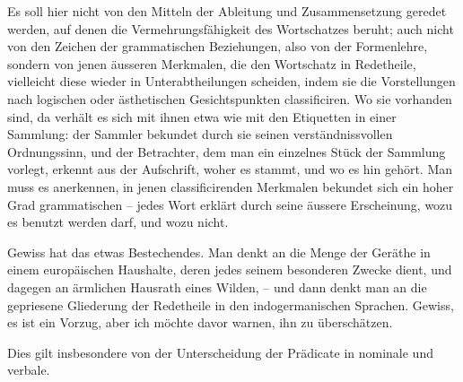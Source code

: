 Es soll hier nicht von den Mitteln der Ableitung und Zusammensetzung geredet werden, auf denen die Vermehrungsfähigkeit des Wortschatzes beruht; auch nicht von den Zeichen der grammatischen Beziehungen, also von der Formenlehre, sondern von jenen äusseren Merkmalen, die den Wortschatz in Redetheile, vielleicht diese wieder in Unterabtheilungen scheiden, indem sie die Vorstellungen nach logischen oder ästhetischen Gesichtspunkten classificiren. Wo sie vorhanden sind, da verhält es sich mit ihnen etwa wie mit den Eti\label{sp.439}quetten in einer Sammlung: der Sammler bekundet durch sie seinen verständnissvollen Ordnungssinn, und der Betrachter, dem man ein einzelnes Stück der Sammlung vorlegt, erkennt aus der Aufschrift, woher es stammt, und wo es hin gehört. Man muss es anerkennen, in jenen classificirenden Merkmalen bekundet sich ein hoher Grad grammatischen  – jedes Wort erklärt durch seine äussere Erscheinung, wozu es benutzt werden darf, und wozu nicht.

\largerpage[2]Gewiss hat das etwas Bestechendes. Man denkt an die Menge der Geräthe in einem  europäischen Haushalte, deren jedes seinem besonderen Zwecke dient, und dagegen an  ärmlichen Hausrath eines Wilden, – und dann denkt man an die gepriesene Gliederung der Redetheile in den indogermanischen Sprachen. Gewiss, es ist ein Vorzug, aber ich möchte davor warnen, ihn zu überschätzen.

Dies gilt insbesondere von der Unterscheidung der Prädicate in nominale und verbale. 

